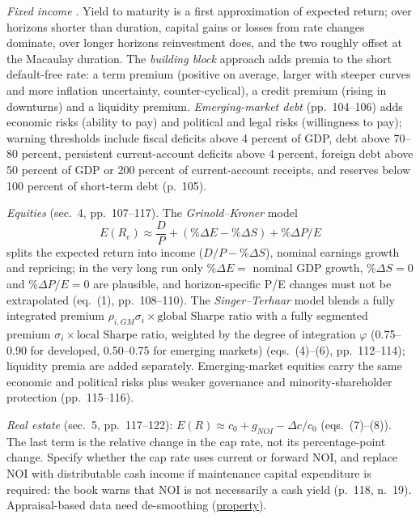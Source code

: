 \begin{qfmethod}\label{meth:asset-class-return-forecasts}
 \emph{Fixed income} \citep[chap.~4, sec.~3, pp.~96--104]{portfolio-management-in-practice-v1-2020}. Yield to maturity is a first approximation of expected return; over horizons shorter than duration, capital gains or losses from rate changes dominate, over longer horizons reinvestment does, and the two roughly offset at the Macaulay duration. The \emph{building block} approach adds premia to the short default-free rate: a term premium (positive on average, larger with steeper curves and more inflation uncertainty, counter-cyclical), a credit premium (rising in downturns) and a liquidity premium. \emph{Emerging-market debt} (pp.~104--106) adds economic risks (ability to pay) and political and legal risks (willingness to pay); warning thresholds include fiscal deficits above 4 percent of GDP, debt above 70--80 percent, persistent current-account deficits above 4 percent, foreign debt above 50 percent of GDP or 200 percent of current-account receipts, and reserves below 100 percent of short-term debt (p.~105).

\emph{Equities} (sec.~4, pp.~107--117). The \emph{Grinold--Kroner} model
\[
E(R_e)\approx\frac{D}{P}+(\%\Delta E-\%\Delta S)+\%\Delta P/E
\]
splits the expected return into income ($D/P-\%\Delta S$), nominal earnings growth and repricing; in the very long run only $\%\Delta E=$ nominal GDP growth, $\%\Delta S=0$ and $\%\Delta P/E=0$ are plausible, and horizon-specific P/E changes must not be extrapolated (eq.~(1), pp.~108--110). The \emph{Singer--Terhaar} model blends a fully integrated premium $\rho_{i,GM}\sigma_i\times\text{global Sharpe ratio}$ with a fully segmented premium $\sigma_i\times\text{local Sharpe ratio}$, weighted by the degree of integration $\varphi$ (0.75--0.90 for developed, 0.50--0.75 for emerging markets) (eqs.~(4)--(6), pp.~112--114); liquidity premia are added separately. Emerging-market equities carry the same economic and political risks plus weaker governance and minority-shareholder protection (pp.~115--116).

\emph{Real estate} (sec.~5, pp.~117--122): $E(R)\approx c_0+g_{NOI}-\Delta c/c_0$ (eqs.~(7)--(8)). The last term is the relative change in the cap rate, not its percentage-point change. Specify whether the cap rate uses current or forward NOI, and replace NOI with distributable cash income if maintenance capital expenditure is required: the book warns that NOI is not necessarily a cash yield (p.~118, n.~19). Appraisal-based data need de-smoothing (\hyperref[meth:cycle-equities-property]{property}).


\end{qfmethod}
